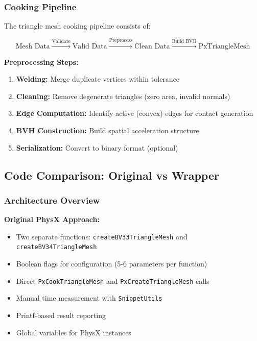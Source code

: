 \subsubsection{Cooking Pipeline}

The triangle mesh cooking pipeline consists of:

\begin{equation}
\text{Mesh Data} \xrightarrow{\text{Validate}} \text{Valid Data} \xrightarrow{\text{Preprocess}} \text{Clean Data} \xrightarrow{\text{Build BVH}} \text{PxTriangleMesh}
\end{equation}

\textbf{Preprocessing Steps:}
\begin{enumerate}
    \item \textbf{Welding:} Merge duplicate vertices within tolerance
    \item \textbf{Cleaning:} Remove degenerate triangles (zero area, invalid normals)
    \item \textbf{Edge Computation:} Identify active (convex) edges for contact generation
    \item \textbf{BVH Construction:} Build spatial acceleration structure
    \item \textbf{Serialization:} Convert to binary format (optional)
\end{enumerate}


\subsection{Code Comparison: Original vs Wrapper}

\subsubsection{Architecture Overview}

\textbf{Original PhysX Approach:}
\begin{itemize}
    \item Two separate functions: \texttt{createBV33TriangleMesh} and \texttt{createBV34TriangleMesh}
    \item Boolean flags for configuration (5-6 parameters per function)
    \item Direct \texttt{PxCookTriangleMesh} and \texttt{PxCreateTriangleMesh} calls
    \item Manual time measurement with \texttt{SnippetUtils}
    \item Printf-based result reporting
    \item Global variables for PhysX instances
\end{itemize}

